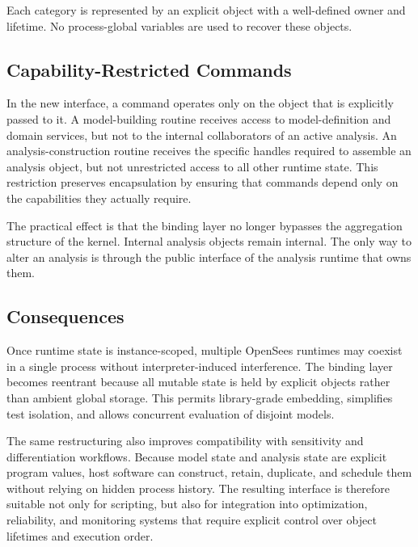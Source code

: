 Each category is represented by an explicit object with a well-defined
owner and lifetime.
No process-global variables are used to recover these objects.

\subsection{Capability-Restricted Commands}

In the new interface, a command operates only on the object that is
explicitly passed to it.
A model-building routine receives access to model-definition and domain
services, but not to the internal collaborators of an active analysis.
An analysis-construction routine receives the specific handles required
to assemble an analysis object, but not unrestricted access to all other
runtime state.
This restriction preserves encapsulation by ensuring that commands depend only on the
capabilities they actually require.

The practical effect is that the binding layer no longer bypasses the
aggregation structure of the kernel.
Internal analysis objects remain internal.
The only way to alter an analysis is through the public interface of the
analysis runtime that owns them.

\subsection{Consequences}

Once runtime state is instance-scoped, multiple OpenSees runtimes may
coexist in a single process without interpreter-induced interference.
The binding layer becomes reentrant because all mutable state is held by
explicit objects rather than ambient global storage.
This permits library-grade embedding, simplifies test isolation, and
allows concurrent evaluation of disjoint models.

The same restructuring also improves compatibility with sensitivity and
differentiation workflows.
Because model state and analysis state are explicit program values, host
software can construct, retain, duplicate, and schedule them without
relying on hidden process history.
The resulting interface is therefore suitable not only for scripting, but
also for integration into optimization, reliability, and monitoring
systems that require explicit control over object lifetimes and
execution order.
